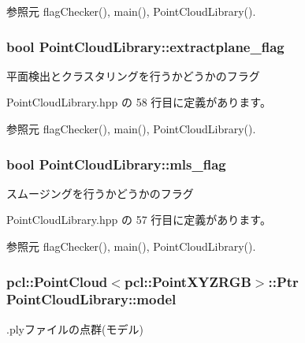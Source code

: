 参照元 flag\-Checker(), main(), Point\-Cloud\-Library().

\subsubsection[{extractplane\-\_\-flag}]{\setlength{\rightskip}{0pt plus 5cm}bool Point\-Cloud\-Library\-::extractplane\-\_\-flag}\label{class_point_cloud_library_a76c829d2feea3efcb84449a0c360ec43}


平面検出とクラスタリングを行うかどうかのフラグ 



 Point\-Cloud\-Library.\-hpp の 58 行目に定義があります。



参照元 flag\-Checker(), main(), Point\-Cloud\-Library().

\subsubsection[{mls\-\_\-flag}]{\setlength{\rightskip}{0pt plus 5cm}bool Point\-Cloud\-Library\-::mls\-\_\-flag}\label{class_point_cloud_library_a0745fdcbdae44048793a4dce33dfeb4f}


スムージングを行うかどうかのフラグ 



 Point\-Cloud\-Library.\-hpp の 57 行目に定義があります。



参照元 flag\-Checker(), main(), Point\-Cloud\-Library().

\subsubsection[{model}]{\setlength{\rightskip}{0pt plus 5cm}pcl\-::\-Point\-Cloud$<$pcl\-::\-Point\-X\-Y\-Z\-R\-G\-B$>$\-::Ptr Point\-Cloud\-Library\-::model}\label{class_point_cloud_library_a9353ff5d5de9f4d0cc755c3f6bff8417}


.plyファイルの点群(モデル) 



